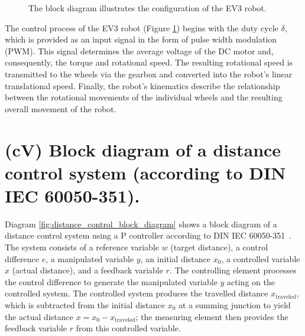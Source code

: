 \documentclass[12pt, oneside, a4paper]{scrreprt}
\begin{document}
\begin{figure}[H]
                \caption{The block diagram illustrates the configuration of the EV3 robot.}
                \label{fig:ev3_blockdiagramm}
            \end{figure}

        The control process of the EV3 robot (Figure \ref{fig:ev3_blockdiagramm}) begins with the duty cycle $\delta$, which is provided as an input signal in the form of pulse width modulation (PWM). This signal determines the average voltage of the DC motor and, consequently, the torque and rotational speed. The resulting rotational speed is transmitted to the wheels via the gearbox and converted into the robot's linear translational speed. Finally, the robot's kinematics describe the relationship between the rotational movements of the individual wheels and the resulting overall movement of the robot.


        \section{(cV) Block diagram of a distance control system (according to DIN IEC 60050-351).}\label{sec:cV}

            Diagram \ref{fig:distance_control_block_diagram} shows a block diagram of a distance control system using a P controller according to DIN IEC 60050-351~\cite{DIN_IEC_60050-351_2014}. The system consists of a reference variable $w$ (target distance), a control difference $e$, a manipulated variable $y$, an initial distance $x_0$, a controlled variable $x$ (actual distance), and a feedback variable $r$. The controlling element processes the control difference to generate the manipulated variable $y$ acting on the controlled system. The controlled system produces the travelled distance $x_\mathrm{traveled}$, which is subtracted from the initial distance $x_0$ at a summing junction to yield the actual distance $x = x_0 - x_\mathrm{traveled}$; the measuring element then provides the feedback variable $r$ from this controlled variable.
\end{document}
